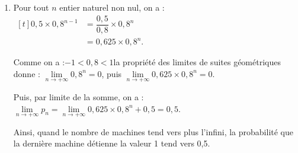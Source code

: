 \begin{enumerate}
\begin{enumerate}
et, par ailleurs, on a :\quad $0,5 \times 0,8^{1 - 1} + 0,5 = 0,5 + 0,5 = 1$.

On constate donc que l'affirmation $P_1$ est vraie.

\textbf{Hérédité :} soit $n$ naturel non nul donné tel que l'affirmation $P_n$ est vraie.

D'après l'hypothèse de récurrence :

$\begin{aligned}
p_n = 0,5 \times 0,8^{n-1} + 0,5
	&\implies 0,8p_n = 0,8\left(0,5 \times 0,8^{n-1} + 0,5\right) \\
	&\implies 0,8p_n = 0,5 \times 0,8^{n-1} \times 0,8 + 0,4 \\
	&\implies 0,8p_n = 0,5 \times 0,8^{n} + 0,4 \\
	&\implies 0,8p_n + 0,1 = 0,5 \times 0,8^{n} + 0,4 + 0,1\\
	&\implies 0,8p_n + 0,1 = 0,5 \times 0,8^{n} + 0,5\\
	&\implies p_{n+1} = 0,5 \times 0,8^{n} + 0,5\quad \text{c'est }P_{n+1}\\
\end{aligned}$

\textbf{Conclusion :} on a prouvé que l'affirmation $P_1$ est vraie, et que, $n$ étant un naturel non nul, la véracité de $P_n$ entraîne celle de $P_{n+1}$. En vertu du principe de récurrence, on peut conclure que :

$\forall n \in \N^{*},\quad u_n = 0,5 \times 0,8^{n-1} + 0,5$.

Autrement dit, on a établi par récurrence une expression explicite du terme général $p_n$.

		\item Pour tout $n$ entier naturel non nul, on a : \quad $\begin{aligned}[t]
			0,5 \times 0,8^{n-1} &= \dfrac{0,5}{0,8} \times 0,8^{n} \\&= 0,625 \times 0,8^n.
		\end{aligned}$

		Comme on a :\quad $-1 < 0,8 < 1$\quad la propriété des limites de suites géométriques donne : \quad $\lim\limits_{n \to +\infty} 0,8^n = 0$, puis $\lim\limits_{n \to +\infty} 0,625 \times 0,8^n = 0$.

Puis, par limite de la somme, on a :\quad $\lim\limits_{n \to +\infty} p_n = \lim\limits_{n \to +\infty} 0,625 \times 0,8^n + 0,5 = 0,5$.

Ainsi, quand le nombre de machines tend vers plus l'infini, la probabilité que la dernière machine détienne la valeur 1 tend vers 0,5.
	\end{enumerate}
\end{enumerate}

